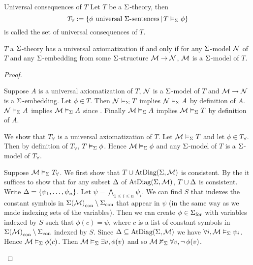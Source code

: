 \begin{nttn}{Universal consequences of $T$}
    Let $T$ be a $\Sigma$-theory, then 
    \[
        T_\forall := 
        \left\{\phi \text{ universal $\Sigma$-sentences} \,|\, T \vDash_{\Sigma} \phi\right\}
    \]
    is called the set of universal consequences of $T$.
\end{nttn}

\begin{prop}
    $T$ a $\Sigma$-theory has a universal axiomatization if and only if
    for any $\Sigma$-model $\mathcal{N}$ of $T$ and any $\Sigma$-embedding 
    from some $\Sigma$-structure $\mathcal{M} \to \mathcal{N}$,
    $\mathcal{M}$ is a $\Sigma$-model of $T$.
\end{prop}
\begin{proof}
    \begin{forward}
        Suppose $A$ is a universal axiomatization of $T$,
        $\mathcal{N}$ is a $\Sigma$-model of $T$ and $\mathcal{M} \to \mathcal{N}$ is a 
        $\Sigma$-embedding.
        Let $\phi \in T$. Then
        $\mathcal{N} \vDash_{\Sigma} T$ implies $\mathcal{N} \vDash_{\Sigma} A$
        by definition of $A$.
        $\mathcal{N} \vDash_{\Sigma} A$ implies $\mathcal{M} \vDash_{\Sigma} A$
        since .
        Finally $\mathcal{M} \vDash_{\Sigma} A$ implies $\mathcal{M} \vDash_{\Sigma} T$
        by definition of $A$.
    \end{forward}

    \begin{backward}
        We show that $T_\forall$ is a universal axiomatization of $T$.
        Let $\mathcal{M} \vDash_{\Sigma} T$ and let $\phi \in T_\forall$.
        Then by definition of $T_\forall$, $T \vDash_{\Sigma} \phi$.
        Hence $\mathcal{M} \vDash_{\Sigma} \phi$ and any $\Sigma$-model of $T$ is
        a $\Sigma$-model of $T_\forall$.

        Suppose $\mathcal{M} \vDash_{\Sigma} T_\forall$.
        We first show that $T \cup \mathrm{AtDiag}(\Sigma,\mathcal{M})$ is consistent.
        By the  
        it suffices to show that for any subset 
        $\Delta$ of $\mathrm{AtDiag}(\Sigma,\mathcal{M})$,
        $T \cup \Delta$ is consistent.
        Write $\Delta  = \left\{\psi_1, \dots, \psi_n\right\}$.
        Let $\psi = \bigwedge_{1 \leq i \leq n} \psi_i$.
        We can find $S$ that indexes the constant symbols in 
        ${\Sigma(\mathcal{M})}_\mathrm{con} \setminus {\Sigma}_\mathrm{con}$ that appear in $\psi$ 
        (in the same way as we made indexing sets of the variables).
        Then we can create $\phi \in {\Sigma}_\mathrm{for}$ 
        with variables indexed by $S$ such that 
        $\phi(c) = \psi$, 
        where $c$ is a list of constant symbols in 
        ${\Sigma(\mathcal{M})}_\mathrm{con} \setminus {\Sigma}_\mathrm{con}$ indexed by $S$.
        Since $\Delta \subseteq \mathrm{AtDiag}(\Sigma,\mathcal{M})$ we have
        $\forall i, \mathcal{M} \vDash_{\Sigma} \psi_i$.
        Hence $\mathcal{M} \vDash_{\Sigma} \phi(c)$.
        Then $\mathcal{M} \vDash_{\Sigma} \exists v,  \phi(v)$ and so
        $\mathcal{M} \nvDash_{\Sigma} \forall v,  \neg\, \phi(v)$.


\end{backward}
\end{proof}
